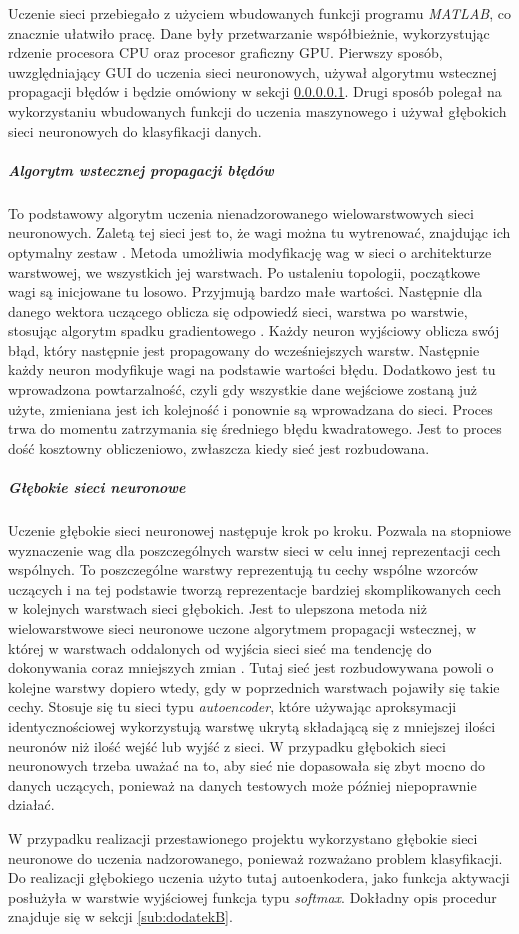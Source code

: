 Uczenie sieci przebiegało z użyciem wbudowanych funkcji programu \textit{MATLAB}, co znacznie ułatwiło pracę. Dane były przetwarzanie współbieżnie, wykorzystując rdzenie procesora CPU oraz procesor graficzny GPU. Pierwszy sposób, uwzględniający GUI do uczenia sieci neuronowych, używał algorytmu wstecznej propagacji błędów i będzie omówiony w sekcji \ref{sub:wstecz}. Drugi sposób polegał na wykorzystaniu wbudowanych funkcji do uczenia maszynowego i używał głębokich sieci neuronowych do klasyfikacji danych. 

\subparagraph{Algorytm wstecznej propagacji błędów}
\label{sub:wstecz}

To podstawowy algorytm uczenia nienadzorowanego wielowarstwowych sieci neuronowych. Zaletą tej sieci jest to, że wagi można tu wytrenować, znajdując ich optymalny zestaw \cite{back}. Metoda umożliwia modyfikację wag w sieci o architekturze warstwowej, we wszystkich jej warstwach. Po ustaleniu topologii, początkowe wagi są inicjowane tu losowo. Przyjmują bardzo małe wartości. Następnie dla danego wektora uczącego oblicza się odpowiedź sieci, warstwa po warstwie, stosując algorytm spadku gradientowego \cite{back2}. Każdy neuron wyjściowy oblicza swój błąd, który następnie jest propagowany do wcześniejszych warstw. Następnie każdy neuron modyfikuje wagi na podstawie wartości błędu. Dodatkowo jest tu wprowadzona powtarzalność, czyli gdy wszystkie dane wejściowe zostaną już użyte, zmieniana jest ich kolejność i ponownie są wprowadzana do sieci. Proces trwa do momentu zatrzymania się średniego błędu kwadratowego. Jest to proces dość kosztowny obliczeniowo, zwłaszcza kiedy sieć jest rozbudowana.

\subparagraph{Głębokie sieci neuronowe}
\label{sub:glebokie}

Uczenie głębokie sieci neuronowej następuje krok po kroku. Pozwala na stopniowe wyznaczenie wag dla poszczególnych warstw sieci w celu innej reprezentacji cech wspólnych. To poszczególne warstwy reprezentują tu cechy wspólne wzorców uczących i na tej podstawie tworzą reprezentacje bardziej skomplikowanych cech w kolejnych warstwach sieci głębokich. Jest to ulepszona metoda niż wielowarstwowe sieci neuronowe uczone algorytmem propagacji wstecznej, w której w warstwach oddalonych od wyjścia sieci sieć ma tendencję do dokonywania coraz mniejszych zmian \cite{deep}. Tutaj sieć jest rozbudowywana powoli o kolejne warstwy dopiero wtedy, gdy w poprzednich warstwach pojawiły się takie cechy. Stosuje się tu sieci typu \textit{autoencoder}, które używając aproksymacji identycznościowej wykorzystują warstwę ukrytą składającą się z mniejszej ilości neuronów niż ilość wejść lub wyjść z sieci. W przypadku głębokich sieci neuronowych trzeba uważać na to, aby sieć nie dopasowała się zbyt mocno do danych uczących, ponieważ na danych testowych może później niepoprawnie działać.

W przypadku realizacji przestawionego projektu wykorzystano głębokie sieci neuronowe do uczenia nadzorowanego, ponieważ rozważano problem klasyfikacji. Do realizacji głębokiego uczenia użyto tutaj autoenkodera, jako funkcja aktywacji posłużyła w warstwie wyjściowej funkcja typu \textit{softmax}. Dokładny opis procedur znajduje się w sekcji \ref{sub:dodatekB}.

